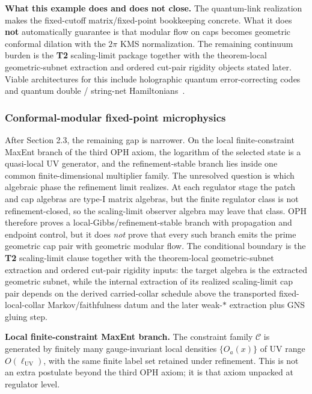 \textbf{What this example does and does not close.} The quantum-link realization makes the fixed-cutoff matrix/fixed-point bookkeeping concrete. What it does \textbf{not} automatically guarantee is that modular flow on caps becomes geometric conformal dilation with the \(2\pi\) KMS normalization. The remaining continuum burden is the \textbf{T2} scaling-limit package together with the theorem-local geometric-subnet extraction and ordered cut-pair rigidity objects stated later. Viable architectures for this include holographic quantum error-correcting codes~\cite{pastawski15} and quantum double / string-net Hamiltonians~\cite{levinWen05}.

\subsubsection{Conformal-modular fixed-point microphysics}\label{27-conformal-modular-fixed-point-microphysics-cmfp}

After Section 2.3, the remaining gap is narrower. On the local finite-constraint MaxEnt branch of the third OPH axiom, the logarithm of the selected state is a quasi-local UV generator, and the refinement-stable branch lies inside one common finite-dimensional multiplier family. The unresolved question is which algebraic phase the refinement limit realizes. At each regulator stage the patch and cap algebras are type-I matrix algebras, but the finite regulator class is not refinement-closed, so the scaling-limit observer algebra may leave that class. OPH therefore proves a local-Gibbs/refinement-stable branch with propagation and endpoint control, but it does \emph{not} prove that every such branch emits the prime geometric cap pair with geometric modular flow. The conditional boundary is the \textbf{T2} scaling-limit clause together with the theorem-local geometric-subnet extraction and ordered cut-pair rigidity inputs: the target algebra is the extracted geometric subnet, while the internal extraction of its realized scaling-limit cap pair depends on the derived carried-collar schedule above the transported fixed-local-collar Markov/faithfulness datum and the later weak-\(*\) extraction plus GNS gluing step.

\textbf{Local finite-constraint MaxEnt branch.} The constraint family \(\mathcal C\) is generated by finitely many gauge-invariant local densities \(\{O_a(x)\}\) of UV range \(O(\ell_{\mathrm{UV}})\), with the same finite label set retained under refinement. This is not an extra postulate beyond the third OPH axiom; it is that axiom unpacked at regulator level.

